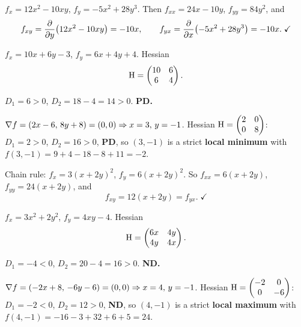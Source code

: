 \begin{solutions}
  \item $f_x = 12x^{2} - 10xy$, $f_y = -5x^{2} + 28y^{3}$. Then
        $f_{xx} = 24x - 10y$, $f_{yy} = 84y^{2}$, and
        \[
          f_{xy} = \frac{\partial }{\partial y}\bigl(12x^{2}-10xy\bigr) = -10x, \qquad
          f_{yx} = \frac{\partial }{\partial x}\bigl(-5x^{2}+28y^{3}\bigr) = -10x . \; \checkmark
        \]

  \item $f_x = 10x + 6y - 3$, $f_y = 6x + 4y + 4$. Hessian
        \[
          \operatorname{H} = \begin{pmatrix}10&6\\6&4\end{pmatrix} .
        \]

  \item $D_1 = 6 > 0$, $D_2 = 18 - 4 = 14 > 0$. \textbf{PD.}

  \item $\nabla f = (2x-6,\,8y+8) = (0,0) \Rightarrow x=3,\,y=-1$. Hessian
        $\operatorname{H} = \begin{pmatrix}2&0\\0&8\end{pmatrix}$: $D_1=2>0$,
        $D_2=16>0$, \textbf{PD}, so $(3,-1)$ is a strict \textbf{local
        minimum} with $f(3,-1) = 9+4-18-8+11 = -2$.

  \item Chain rule: $f_x = 3(x+2y)^{2}$, $f_y = 6(x+2y)^{2}$. So
        $f_{xx} = 6(x+2y)$, $f_{yy} = 24(x+2y)$, and
        \[
          f_{xy} = 12(x+2y) = f_{yx} . \; \checkmark
        \]

  \item $f_x = 3x^{2} + 2y^{2}$, $f_y = 4xy - 4$. Hessian
        \[
          \operatorname{H} = \begin{pmatrix}6x&4y\\4y&4x\end{pmatrix} .
        \]

  \item $D_1 = -4 < 0$, $D_2 = 20 - 4 = 16 > 0$. \textbf{ND.}

  \item $\nabla f = (-2x+8,\,-6y-6) = (0,0) \Rightarrow x=4,\,y=-1$. Hessian
        $\operatorname{H} = \begin{pmatrix}-2&0\\0&-6\end{pmatrix}$: $D_1=-2<0$,
        $D_2=12>0$, \textbf{ND}, so $(4,-1)$ is a strict \textbf{local
        maximum} with $f(4,-1) = -16-3+32+6+5 = 24$.


\end{solutions}
